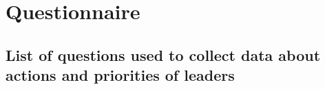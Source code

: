 \chapter{Questionnaire}

\lstset{language=tex}

\section{List of questions used to collect data about actions and priorities of leaders}

\lstset{caption=List of questions, label=lst:makefile-test}


